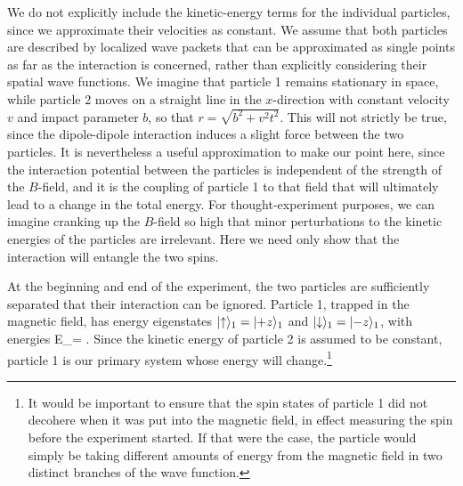 \documentclass[aps,prd,onecolumn,nofootinbib,notitlepage]{revtex4-1}
\begin{document}
We do not explicitly include the kinetic-energy terms for the individual particles, since we approximate their velocities as constant.
We assume that both particles are described by localized wave packets that can be approximated as single points as far as the interaction is concerned, rather than explicitly considering their spatial wave functions.
We imagine that particle 1 remains stationary in space, while particle 2 moves on a straight line in the $x$-direction with constant velocity $v$ and impact parameter $b$, so that $r=\sqrt{b^2 + v^2t^2}$.
This will not strictly be true, since the dipole-dipole interaction induces a slight force between the two particles.
It is nevertheless a useful approximation to make our point here, since the interaction potential between the particles is independent of the strength of the $B$-field, and it is the coupling of particle 1 to that field that will ultimately lead to a change in the total energy. 
For thought-experiment purposes, we can imagine cranking up the $B$-field so high that minor perturbations to the kinetic energies of the particles are irrelevant. Here we need only show that the interaction will entangle the two spins.

At the beginning and end of the experiment, the two particles are sufficiently separated that their interaction can be ignored.
Particle 1, trapped in the magnetic field, has energy eigenstates $\lvert \uparrow\rangle_1 = \lvert +z\rangle_1$ and $\lvert \downarrow\rangle_1=\lvert -z\rangle_1$, with energies 
\be
E_\pm = \pm {}\omega.
\label{energy_eigenvalues}
\ee
Since the kinetic energy of particle 2 is assumed to be constant, particle 1 is our primary system whose energy will change.\footnote{It would be important to ensure that the spin states of particle 1 did not decohere when it was put into the magnetic field, in effect measuring the spin before the experiment started.
If that were the case, the particle would simply be taking different amounts of energy from the magnetic field in two distinct branches of the wave function.}
\end{document}
